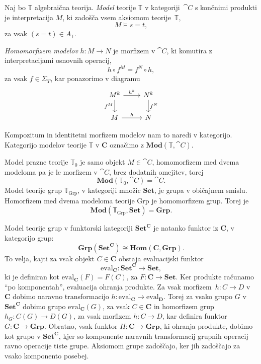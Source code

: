 \documentclass[../kategoricna_logika.tex]{subfiles}
\begin{document}
%
\begin{definicija}
Naj bo $\mathbb{T}$ algebraična teorija.
\emph{Model} teorije $\mathbb{T}$ v kategoriji~$\cat{C}$ s
končnimi produkti je interpretacija $M$, ki zadošča vsem aksiomom
teorije~$\mathbb{T}$,
$$M \models s = t,$$
za vsak $(s = t) \in A_\mathbb{T}$.
\end{definicija}
%
\begin{definicija}
 \emph{Homomorfizem modelov} $h : M \to N$ je morfizem v
 $\cat{C}$, ki komutira z interpretacijami osnovnih operacij,
$$h \circ f^M = f^N \circ h,$$
za vsak $f \in \Sigma_T$, kar ponazorimo v diagramu
\begin{equation*}
  \begin{tikzcd}
    M^k \ar[d, "f^M"'] \ar[r, "h^k"] & N^k \ar[d, "f^N"] \\
    M \ar[r, "h"] & N
  \end{tikzcd}
\end{equation*}
\end{definicija}
Kompozitum in identitetni morfizem modelov nam to naredi v kategorijo.
Kategorijo modelov teorije $\mathbb{T}$ v $\mathbf{C}$ označimo z
$\mathbf{Mod}(\mathbb{T}, \cat{C})$.
%
\begin{primer}
  Model prazne teorije $\mathbb{T}_0$ je samo objekt $M \in \cat{C}$,
  homomorfizem med dvema modeloma pa je le morfizem v $\cat{C}$, brez
  dodatnih omejitev, torej
$$\mathbf{Mod}(\mathbb{T}_0, \cat{C}) = \cat{C}.$$
%
Model teorije grup $\mathbb{T}_{\mathrm{Grp}}$, v kategoriji množic
$\mathbf{Set}$, je grupa v običajnem smislu. Homorfizem med dvema modeloma
teorije $\mathrm{Grp}$ je homomorfizem grup. Torej je
$$\mathbf{Mod}(\mathbb{T}_{\mathrm{Grp}}, \mathbf{Set}) = \mathbf{Grp}.$$
\end{primer}
% 
\begin{primer}
  Model teorije grup v funktorski kategoriji $\mathbf{Set}^{\mathbf{C}}$ je
  natanko funktor iz $\mathbf{C}$, v kategorijo grup:
  \[ \mathbf{Grp}(\mathbf{Set}^{\mathbf{C}}) \cong \mathbf{Hom}(\mathbf{C}, \mathbf{Grp}). \]
  To velja, kajti za vsak objekt $C \in \mathbf{C}$ obstaja evaluacijski
  funktor
  \[ \mathrm{eval}_{\mathbf{C}} : \mathbf{Set}^{\mathbf{C}} \to \mathbf{Set}, \]
  ki je definiran kot $\mathrm{eval}_{\mathbf{C}}(F) = F(C)$, za $F : \mathbf{C} \to \mathbf{Set}$.
  Ker produkte računamo "`po komponentah"', evaluacija ohranja produkte.
  Za vsak morfizem~${h : C \to D}$ v $\mathbf{C}$ dobimo naravno
  transformacijo $h : \mathrm{eval}_{\mathbf{C}} \to \mathrm{eval}_{\mathbf{D}}$.
  Torej za vsako grupo $G$ v $\mathbf{Set}^{\mathbf{C}}$ dobimo grupo
  $\mathrm{eval}_{\mathbf{C}}(G)$, za vsak $C \in \mathbf{C}$ in homorfizem grup
  $h_{G} : C(G) \to D(G)$, za vsak morfizem $h : C \to D$,
  kar definira funktor $G : \mathbf{C} \to \mathbf{Grp}$.
  Obratno, vsak funktor $H : \mathbf{C} \to \mathbf{Grp}$, ki ohranja produkte,
  dobimo kot grupo v $\mathbf{Set}^{\mathbf{C}}$, kjer so komponente
  naravnih transformacij grupnih operacij ravno operacije tiste grupe.
  Aksiomom grupe zadoščajo, ker jih zadoščajo za vsako komponento posebej.
\end{primer}
%
\end{document}
